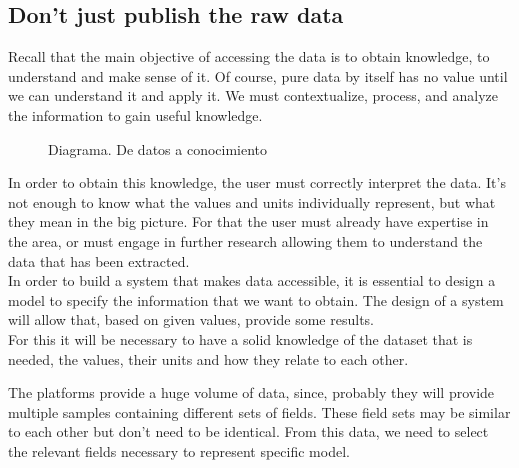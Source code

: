 \subsection{Don't just publish the raw data}

Recall that the main objective of accessing the data is to obtain knowledge, to understand and make sense of it. Of course, 
pure data by itself has no value until we can understand it and apply it. We must contextualize, process, and analyze the 
information to gain useful knowledge. \\ 
    
\begin{figure}[ht]
    \centering 
    \caption{Diagrama. De datos a conocimiento}
\end{figure}
 
In order to obtain this knowledge, the user must correctly interpret the data. It's not enough to know what the values and 
units individually represent, but what they mean in the big picture. For that the user must already have expertise in the 
area, or must engage in further research allowing them to understand the data that has been extracted.\\
    
In order to build a system that makes data accessible, it is essential to design a model to specify the
information that we want to obtain. The design of a system will allow that, based on given values, provide some results.\\

For this it will be necessary to have a solid knowledge of the dataset that is needed, the values, their units and how they relate to each other.

The platforms provide a huge volume of data, since, probably they will provide multiple samples containing different sets of fields. 
These field sets may be similar to each other but don't need to be identical.
From this data, we need to select the relevant fields necessary to represent specific model.\\

